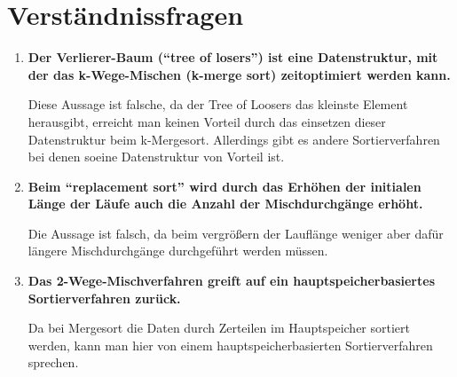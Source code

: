\documentclass{scrartcl}
\begin{document}
\maketitle

\section{Verständnissfragen }
\begin{enumerate}
    \item \textbf{Der Verlierer-Baum (“tree of losers”) ist eine Datenstruktur, mit der das k-Wege-Mischen (k-merge sort) zeitoptimiert werden kann.}
    
    Diese Aussage ist falsche, da der Tree of Loosers das kleinste Element herausgibt, erreicht man keinen Vorteil durch das einsetzen dieser Datenstruktur beim k-Mergesort. Allerdings gibt es andere Sortierverfahren bei denen soeine Datenstruktur von Vorteil ist.
    \item \textbf{Beim “replacement sort” wird durch das Erhöhen der initialen Länge der Läufe auch die Anzahl der Mischdurchgänge erhöht.}
    
    Die Aussage ist falsch, da beim vergrößern der Lauflänge weniger aber dafür längere Mischdurchgänge durchgeführt werden müssen.
    \item \textbf{Das 2-Wege-Mischverfahren greift auf ein hauptspeicherbasiertes Sortierverfahren zurück.}
    
    Da bei Mergesort die Daten durch Zerteilen im Hauptspeicher sortiert werden, kann man hier von einem hauptspeicherbasierten Sortierverfahren sprechen.
\end{enumerate}
\end{document}
